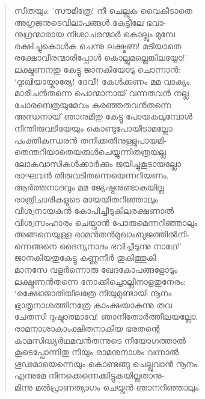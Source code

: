 \begin{verse}
സീതയും: ’സൗമിത്രേ! നീ ചെല്ലുക വൈകീടാതെ\\
അഗ്രജനുടെവിലാപങ്ങള്‍ കേട്ടീലേ ഭവാ-\\
നുഗ്രന്മാരായ നിശാചരന്മാര്‍ കൊല്ലും മുമ്പേ\\
രക്ഷിച്ചുകൊള്‍ക ചെന്നു ലക്ഷ്മണ! മടിയാതെ\\
രക്ഷോവീരന്മാരിപ്പോള്‍ കൊല്ലുമല്ലെങ്കിലയ്യോ!’\\
ലക്ഷ്മണനതു കേട്ടു ജാനകിയോടു ചൊന്നാന്‍:\\
‘ദുഃഖിയായ്കാര്യേ! ദേവീ! കേള്‍ക്കണം മമ വാക്യം.\\
മാരീചന്‍തന്നെ പൊന്മാനായ് വന്നതവന്‍ നല്ല\\
ചോരനെത്രയുമേവം കരഞ്ഞതവന്‍തന്നെ\\
അന്ധനായ് ഞാനുമിതു കേട്ടു പോയകലുമ്പോള്‍\\
നിന്തിരുവടിയേയും കൊണ്ടുപോയീടാമല്ലോ\\
പംക്തികന്ധരന്‍ തനിക്കതിനുള്ളുപായമി-\\
തെന്തറിയാതെയരുള്‍ചെയ്യുന്നിതത്രയല്ല\\
ലോകവാസികള്‍ക്കാര്‍ക്കും ജയിച്ചുകൂടായല്ലോ\\
രാഘവന്‍ തിരുവടിതന്നെയെന്നറിയണം.\\
ആര്‍ത്തനാദവും മമ ജ്യേഷ്ഠനുണ്ടാകയില്ല\\
രാത്രിചാരികളുടെ മായയിതറിഞ്ഞാലും\\
വിശ്വനായകന്‍ കോപിച്ചീടുകിലരക്ഷണാല്‍\\
വിശ്വസംഹാരം ചെയ്വാന്‍ പോരുമെന്നറിഞ്ഞാലും\\
അങ്ങനെയുള്ള രാമന്‍തന്‍മുഖാംബുജത്തില്‍നി-\\
ന്നെങ്ങനെ ദൈന്യനാദം ഭവിച്ചീടുന്നു നാഥേ!’\\
ജാനകിയതുകേട്ടു കണ്ണുനീര്‍ തൂകിത്തൂകി\\
മാനസേ വളര്‍ന്നൊരു ഖേദകോപങ്ങളോടും\\
ലക്ഷ്മണന്‍തന്നെ നോക്കിച്ചൊല്ലിനാളതുനേരം:\\
‘രക്ഷോജാതിയിലത്രേ നീയുമുണ്ടായി നൂനം\\
ഭ്രാതൃനാശത്തിനത്രേ കാംക്ഷയാകുന്നു തവ\\
ചേതസി ദുഷ്ടാത്മാവേ! ഞാനിതോര്‍ത്തീലയല്ലോ.\\
രാമനാശാകാംക്ഷിതനാകിയ ഭരതന്റെ\\
കാമസിദ്ധ്യര്‍ഥമവന്‍തന്നുടെ നിയോഗത്താല്‍\\
കൂടെപ്പോന്നിതു നീയും രാമനുനാശം വന്നാല്‍\\
ഗൂഢമായെന്നെയും കൊണ്ടങ്ങു ചെല്ലുവാന്‍ നൂനം.\\
എന്നുമേ നിനക്കെന്നെക്കിട്ടുകയില്ലതാനു-\\
മിന്നു മല്‍പ്രാണത്യാഗം ചെയ്വന്‍ ഞാനറിഞ്ഞാലും.\\

\end{verse}

